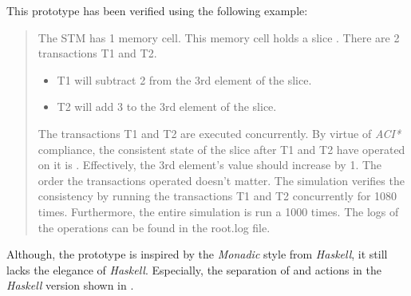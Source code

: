 \documentclass[../main]{subfiles}
\begin{document}
  \par
  This prototype has been verified using the following example:
  
  \begin{quote}
    The STM has 1 memory cell. This memory cell holds a slice . There are 2 transactions T1 and T2. \par

    \begin{itemize}

      \item T1 will subtract 2 from the 3rd element of the slice.

      \item T2 will add 3 to the 3rd element of the slice.

    \end{itemize}

    \par
    The transactions T1 and T2 are executed concurrently. By virtue of {\em ACI*} compliance, the consistent state of the slice  after T1 and T2 have operated on it is . Effectively, the 3rd element's value should increase by 1. The order the transactions operated doesn't matter. The simulation verifies the consistency by running the transactions T1 and T2 concurrently for 1080 times. Furthermore, the entire simulation is run a 1000 times. The logs of the operations can be found in the root.log file.
  \end{quote}

  \par
  Although, the prototype is inspired by the {\em Monadic} style from {\em Haskell}, it still lacks the elegance of {\em Haskell}. Especially, the separation of  and  actions in the {\em Haskell} version shown in \cite{jones2007beautiful}.
\end{document}
